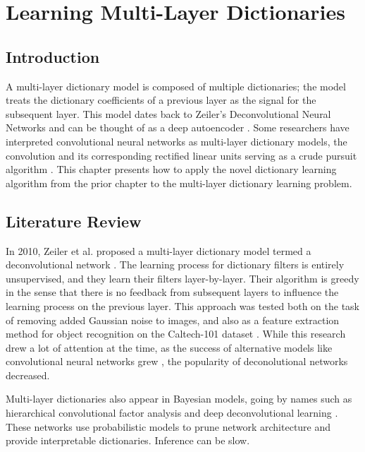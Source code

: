 \chapter{Learning Multi-Layer Dictionaries}
\section{Introduction}
A multi-layer dictionary model is composed of multiple dictionaries; the model treats the dictionary coefficients of a previous layer as the signal for the subsequent layer. This model dates back to Zeiler's Deconvolutional Neural Networks \cite{zeiler2010deconvolutional} and can be thought of as a deep autoencoder \cite[Chapter~14]{Goodfellow2016-DeepLearningBook}\cite{Rangamani2018DictLandAE}. Some researchers have interpreted convolutional neural networks as multi-layer dictionary models, the convolution and its corresponding rectified linear units serving as a crude pursuit algorithm \cite{papyan2017convolutional}. This chapter presents how to apply the novel dictionary learning algorithm from the prior chapter to the multi-layer dictionary learning problem.
\section{Literature Review}
In 2010, Zeiler et al. proposed a multi-layer dictionary model termed a deconvolutional network \cite{zeiler2010deconvolutional}. The learning process for dictionary filters is entirely unsupervised, and they learn their filters layer-by-layer. Their algorithm is greedy in the sense that there is no feedback from subsequent layers to influence the learning process on the previous layer. This approach was tested both on the task of removing added Gaussian noise to images, and also as a feature extraction method for object recognition on the Caltech-101 dataset \cite{fei2004-Caltech101}. While this research drew a lot of attention at the time, as the success of alternative models like convolutional neural networks grew \cite{krizhevsky2012imagenet}, the popularity of deconolutional networks decreased.

Multi-layer dictionaries also appear in Bayesian models, going by names such as hierarchical convolutional factor analysis \cite{chen2011hierarchical}\cite{chen2013deep} and deep deconvolutional learning \cite{pu2014generative}. These networks use probabilistic models to prune network architecture and provide interpretable dictionaries. Inference can be slow.


